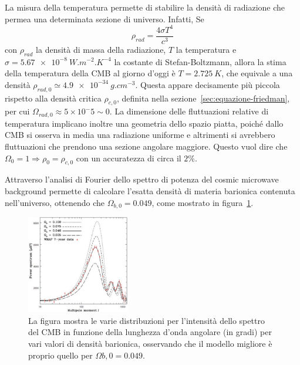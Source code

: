 La misura della temperatura permette di stabilire la densità di radiazione che permea una determinata sezione di universo. Infatti, Se
\[
    \rho_{rad} = \frac{4\sigma T^4}{c^3}
\]
con $\rho_{rad}$ la densità di massa della radiazione, $T$ la temperatura e $\sigma = \SI{5.67e-8}{W.m^{-2}.K^{-4}}$ la costante di Stefan-Boltzmann, allora la stima della temperatura della CMB al giorno d'oggi è $T=\SI{2.725}{K}$, che equivale a una densità $\rho_{rad, 0} \simeq \SI{4.9e-34}{g.cm^{-3}}$. Questa appare decisamente più piccola rispetto alla densità critica $\rho_{c,0}$, definita nella sezione~\ref{sec:equazione-friedman}, per cui $\Omega_{rad,0} \approx 5\times 10^-5 \sim 0$. La dimensione delle fluttuazioni relative di temperatura implicano inoltre una geometria dello spazio piatta, poiché dallo CMB si osserva in media una radiazione uniforme e altrimenti si avrebbero fluttuazioni che prendono una sezione angolare maggiore. Questo vuol dire che $\Omega_0 = 1 \Rightarrow \rho_0 = \rho_{c,0}$ con un accuratezza di circa il $2\%$.

Attraverso l'analisi di Fourier dello spettro di potenza del cosmic microwave background permette di calcolare l'esatta densità di materia barionica contenuta nell'universo, ottenendo che $\Omega_{b,0} = 0.049$, come mostrato in figura~\ref{fig:baryon}.
\begin{figure}
    \centering
    \includegraphics[width=0.4\textwidth]{immagini/barioni.png}
    \caption{La figura mostra le varie distribuzioni per l'intensità dello spettro del CMB in funzione della lunghezza d'onda angolare (in gradi) per vari valori di densità barionica, osservando che il modello migliore è proprio quello per $\Omega{b,0} = 0.049$.}\label{fig:baryon}
\end{figure}

